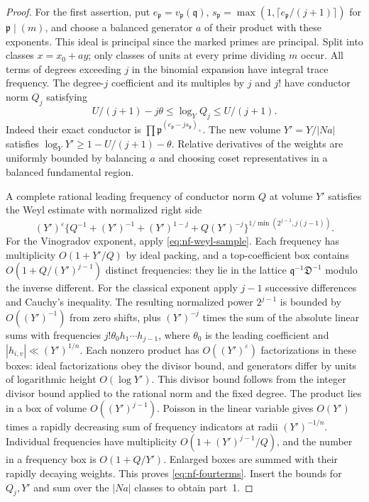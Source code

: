 \documentclass[11pt,letterpaper]{article}
\theoremstyle{definition}
\numberwithin{equation}{section}
\begin{document}
\begin{proof}
For the first assertion, put $e_{\mathfrak p}=v_{\mathfrak p}(\mathfrak q)$,
$s_{\mathfrak p}=\max(1,\lceil e_{\mathfrak p}/(j+1)\rceil)$ for
$\mathfrak p\mid(m)$, and choose a balanced generator $a$ of their
product with these exponents. This ideal is principal since the
marked primes are principal. Split into classes $x=x_0+a y$;
only classes of units at every prime dividing $m$ occur. All terms
of degrees exceeding $j$ in the binomial expansion have integral
trace frequency. The degree-$j$ coefficient and its multiples by
$j$ and $j!$ have conductor norm $Q_j$ satisfying
\[
 U/(j+1)-j\theta\le\log_Y Q_j\le U/(j+1).
\]
Indeed their exact conductor is
$\prod\mathfrak p^{(e_{\mathfrak p}-js_{\mathfrak p})_+}$.
The new volume $Y'=Y/|Na|$ satisfies
$\log_Y Y'\ge1-U/(j+1)-\theta$. Relative derivatives of the
weights are uniformly bounded by balancing $a$ and choosing coset
representatives in a balanced fundamental region.

A complete rational leading frequency of conductor norm $Q$ at
volume $Y'$ satisfies the Weyl estimate with normalized right side
\begin{equation}\label{eq:nf-fourterms}
 (Y')^\varepsilon
 \{Q^{-1}+(Y')^{-1}+(Y')^{1-j}+Q(Y')^{-j}\}^{
                   1/\min(2^{j-1},j(j-1))}.
\end{equation}
For the Vinogradov exponent, apply \eqref{eq:nf-weyl-sample}.
Each frequency has multiplicity $O(1+Y'/Q)$ by ideal packing, and
a top-coefficient box contains $O(1+Q/(Y')^{j-1})$ distinct
frequencies: they lie in the lattice
$\mathfrak q^{-1}\mathfrak D^{-1}$ modulo the inverse different.
For the classical exponent apply $j-1$ successive differences and
Cauchy's inequality. The resulting normalized power $2^{j-1}$ is
bounded by $O((Y')^{-1})$ from zero shifts, plus $(Y')^{-j}$
times the sum of the absolute linear sums with frequencies
$j!\theta_0 h_1\cdots h_{j-1}$, where $\theta_0$ is the leading
coefficient and $|h_{i,v}|\ll(Y')^{1/n}$. Each nonzero product has
$O((Y')^\varepsilon)$ factorizations in these boxes: ideal
factorizations obey the divisor bound, and generators differ by units
of logarithmic height $O(\log Y')$. This divisor bound follows
from the integer divisor bound applied to the rational norm and the
fixed degree. The product lies in a box of volume $O((Y')^{j-1})$.
Poisson in the linear variable gives $O(Y')$ times a rapidly
decreasing sum of frequency indicators at radii $(Y')^{-1/n}$.
Individual frequencies have multiplicity
$O(1+(Y')^{j-1}/Q)$, and the number in a frequency box is
$O(1+Q/Y')$. Enlarged boxes are summed with their rapidly decaying
weights. This proves \eqref{eq:nf-fourterms}. Insert the bounds
for $Q_j,Y'$ and sum over the $|Na|$ classes to obtain part~1.


\end{proof}
\end{document}
